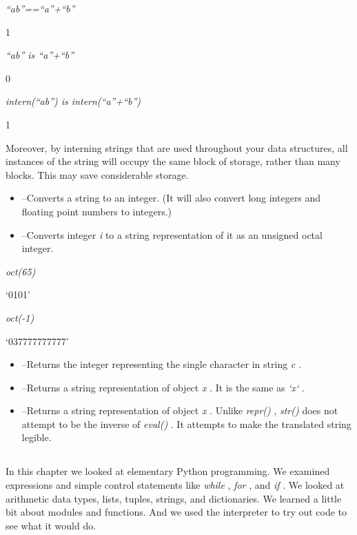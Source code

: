 \emph{``ab''==``a''+``b''}

1


\emph{``ab'' is ``a''+``b''}

0


\emph{intern(``ab'') is intern(``a''+``b'')}

1

Moreover, by interning strings that
are used throughout your data structures, all instances of the string
will occupy the same block of storage, rather than many blocks. This may
save considerable storage.

\begin{itemize}
\tightlist
\item
   --Converts a
  string to an integer. (It will also convert long integers and floating
  point numbers to integers.)
\item
   --Converts integer
  \emph{i} to a string representation of it as an unsigned octal
  integer.
\end{itemize}


\emph{oct(65)}

`0101'


\emph{oct(-1)}

`037777777777'

\begin{itemize}
\tightlist
\item
   --Returns the
  integer representing the single character in string \emph{c} .
\item
   --Returns a
  string representation of object \emph{x} . It is the same as
  \emph{`x`} .
\item
   --Returns a string
  representation of object \emph{x} . Unlike \emph{repr()} ,
  \emph{str()} does not attempt to be the inverse of \emph{eval()} . It
  attempts to make the translated string legible.
\end{itemize}

\subsection[Summary]{}

In this chapter we looked at
elementary Python programming. We examined expressions and simple
control statements like \emph{while} , \emph{for} , and \emph{if} . We
looked at arithmetic data types, lists, tuples, strings, and
dictionaries. We learned a little bit about modules and functions. And
we used the interpreter to try out code to see what it would do.

~

